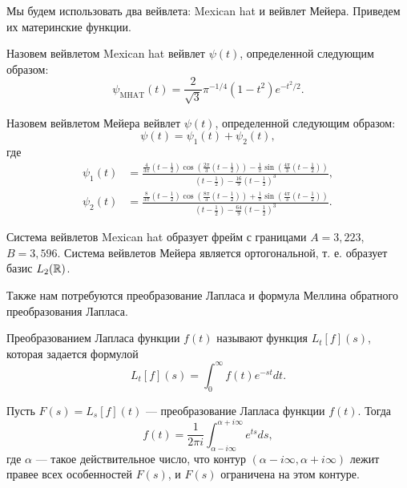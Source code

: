 \documentclass[../paper.tex]{subfiles}
\begin{document}
Мы будем использовать два вейвлета: Mexican hat и вейвлет Мейера. Приведем их материнские функции.

\begin{Def}
	Назовем вейвлетом Mexican hat вейвлет $\psi(t)$, определенной следующим образом:
	\[
		\psi_{\mathrm{MHAT}}(t) = \frac{2}{\sqrt{3}} \pi^{-1/4} \left(1-t^2\right) e^{-t^2/2}
	.\]
\end{Def}
\begin{Def}
	Назовем вейвлетом Мейера вейвлет $\psi(t)$, определенной следующим образом:
	\[
		\psi(t) = \psi_1(t) + \psi_2(t)
	,\] где
	\begin{align*}
		\psi_1(t) &=
			\frac{
				\frac{4}{3\pi}\left(t-\frac{1}{2}\right) \cos\left(\frac{2\pi}{3}\left(t-\frac{1}{2}\right)\right) 
				- \frac{1}{\pi} \sin \left(\frac{4\pi}{3}\left(t-\frac{1}{2}\right)\right)
			}{
				\left(t-\frac{1}{2}\right) - \frac{16}{9} \left(t - \frac{1}{2}\right)^3
			}, \\
		\psi_2(t) &=
			\frac{
				\frac{8}{3\pi}\left(t-\frac{1}{2}\right) \cos\left(\frac{8\pi}{3}\left(t-\frac{1}{2}\right)\right) 
				+ \frac{1}{\pi} \sin \left(\frac{4\pi}{3}\left(t-\frac{1}{2}\right)\right)
			}{
				\left(t-\frac{1}{2}\right) - \frac{64}{9} \left(t - \frac{1}{2}\right)^3
			}.
	\end{align*}
\end{Def}

Система вейвлетов Mexican hat образует фрейм с границами $A=3{,}223$, $B = 3{,}596$. Система вейвлетов Мейера является ортогональной, т. е. образует базис $L_2(\mathbb{R})$.

Также нам потребуются преобразование Лапласа и формула Меллина обратного преобразования Лапласа.
\begin{Def}
Преобразованием Лапласа функции $f(t)$ называют функция $L_t [f](s)$, которая задается формулой
\[
	L_t [f](s) = \int_0^\infty f(t) e^{-st} dt
.\]

\begin{Lem*}
Пусть $F(s) = L_s [f](t)$ --- преобразование Лапласа функции $f(t)$. Тогда
\[
	f(t) = \frac{1}{2\pi i} \int_{\alpha - i \infty}^{\alpha + i \infty} e^{ts} ds
,\] где $\alpha$ --- такое действительное число, что контур $(\alpha - i \infty, \alpha + i \infty)$ лежит правее всех особенностей $F(s)$, и $F(s)$ ограничена на этом контуре.
\end{Lem*}
\end{Def}
\end{document}
